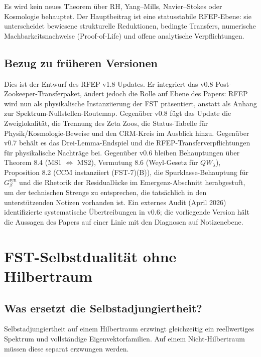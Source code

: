 \documentclass[11pt,a4paper]{article}
\theoremstyle{plain}
\theoremstyle{definition}
\begin{document}
Es wird kein neues Theorem über RH, Yang--Mills, Navier--Stokes oder Kosmologie behauptet.
Der Hauptbeitrag ist eine statusstabile RFEP-Ebene: sie unterscheidet bewiesene
strukturelle Reduktionen, bedingte Transfers, numerische Machbarkeitsnachweise
(Proof-of-Life) und offene analytische Verpflichtungen.

\subsection{Bezug zu früheren Versionen}

Dies ist der Entwurf des RFEP v1.8 Updates. Er integriert das v0.8 Post-Zookeeper-Transferpaket,
ändert jedoch die Rolle auf Ebene des Papers: RFEP wird nun als physikalische Instanziierung
der FST präsentiert, anstatt als Anhang zur Spektrum-Nullstellen-Routemap. Gegenüber v0.8
fügt das Update die Zweiglokalität, die Trennung des Zeta Zoos, die Status-Tabelle
für Physik/Kosmologie-Beweise und den CRM-Kreis im Ausblick hinzu. Gegenüber v0.7
behält es das Drei-Lemma-Endspiel und die RFEP-Transferverpflichtungen für physikalische
Nachträge bei. Gegenüber v0.6 bleiben Behauptungen über Theorem 8.4 (MS1 $\Leftrightarrow$ MS2),
Vermutung 8.6 (Weyl-Gesetz für $QW_\lambda$), Proposition 8.2 (CCM instanziiert (FST-7)(B)),
die Spurklasse-Behauptung für $G_\beta^{\mathrm{ren}}$ und die Rhetorik der Residuallücke
im Emergenz-Abschnitt herabgestuft, um der technischen Strenge zu entsprechen, die
tatsächlich in den unterstützenden Notizen vorhanden ist. Ein externes Audit (April 2026)
identifizierte systematische Übertreibungen in v0.6; die vorliegende Version hält
die Aussagen des Papers auf einer Linie mit den Diagnosen auf Notizenebene.

\section{FST-Selbstdualität ohne Hilbertraum}
\label{sec:fst-duality}

\subsection{Was ersetzt die Selbstadjungiertheit?}

Selbstadjungiertheit auf einem Hilbertraum erzwingt gleichzeitig ein reellwertiges Spektrum
und vollständige Eigenvektorfamilien. Auf einem Nicht-Hilbertraum müssen diese
separat erzwungen werden.
\end{document}
